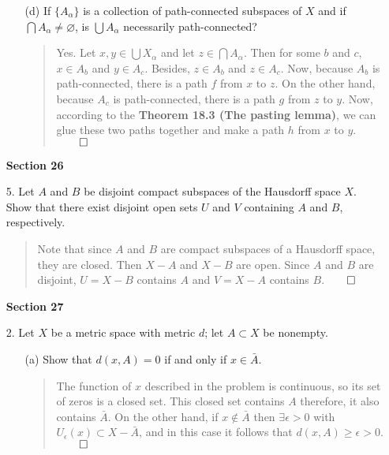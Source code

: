 \documentclass[12pt, a4paper]{article}
\renewcommand{\emptyset}{\varnothing}  %
\begin{document}
\begin{itemize}
\begin{itemize}
\item[]

\item[(d)]
If $\{A_\alpha\}$ is a collection of path-connected subspaces of $X$ and if $\bigcap A_\alpha \neq \emptyset$, is $\bigcup A_\alpha$ necessarily path-connected?
\begin{quote}
Yes. Let $x, y \in \bigcup X_\alpha$ and let $z \in \bigcap A_\alpha$.
Then for some $b$ and $c$, $x \in A_b$ and $y \in A_c$. Besides, $z \in A_b$
and $z \in A_c$. Now, because $A_b$ is path-connected, there is a path $f$
from $x$ to $z$. On the other hand, because $A_c$ is path-connected,
there is a path $g$ from $z$ to $y$. Now, according to the \textbf{Theorem 18.3 (The pasting lemma)},
we can glue these two paths together and make a path $h$ from $x$ to $y$.$\qed$
\end{quote}
\end{itemize}

\item[]
\item[]
{\large \textbf{Section 26}}
\vspace{0.3cm}

\item[5.]
Let $A$ and $B$ be disjoint compact subspaces of the Hausdorff space $X$. Show that there exist disjoint open sets $U$ and $V$ containing $A$ and $B$, respectively.
\begin{quote}
Note that since $A$ and $B$ are compact subspaces of a Hausdorff space, they are closed.
Then $X - A$ and $X - B$ are open. Since $A$ and $B$ are disjoint, $U = X - B$ contains $A$ and $V = X - A$ contains $B$.$\qed$
\end{quote}

\item[]
\item[]
\item[]
{\large \textbf{Section 27}}
\vspace{0.3cm}

\item[2.]
Let $X$ be a metric space with metric $d$; let $A \subset X$ be nonempty.
\begin{itemize}
\item[(a)]
Show that $d(x, A) = 0$ if and only if $x \in \bar{A}$.
\begin{quote}
The function of $x$ described in the problem is continuous, so its set of zeros is a closed set.
This closed set contains $A$ therefore, it also contains $\bar{A}$. On the other hand, if $x \notin \bar{A}$ then $\exists \epsilon > 0$ with $U_\epsilon(x) \subset X - \bar{A}$, and in this case it follows that $d(x, A) \geq \epsilon > 0$.$\qed$
\end{quote}


\end{itemize}
\end{itemize}
\end{document}
